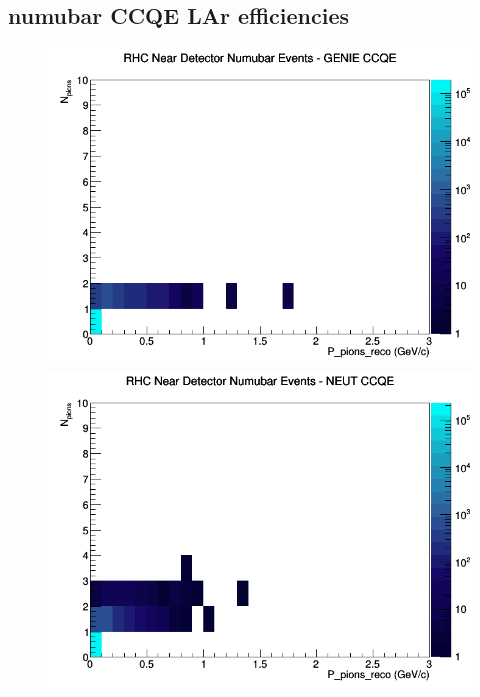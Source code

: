 \documentclass[12pt]{article}
\begin{document}
\subsection{numubar CCQE LAr efficiencies}
\begin{figure}[h]
\includegraphics[width=\linewidth]{eff_N_P/LAr/pions/CCQE_RHC_ND_numubar_N_P_GENIE.png}
\endminipage
{}
\includegraphics[width=\linewidth]{eff_N_P/LAr/pions/CCQE_RHC_ND_numubar_N_P_NEUT.png}
\endminipage
{}

\end{figure}
\end{document}
